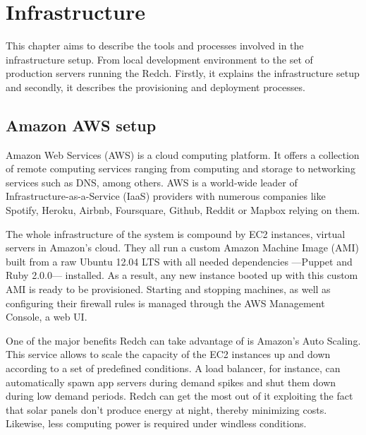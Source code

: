 \chapter{Infrastructure}

This chapter aims to describe the tools and processes involved in the infrastructure setup. From local development environment to the set of production servers running the Redch. Firstly, it explains the infrastructure setup and secondly, it describes the provisioning and deployment processes.

\section{Amazon AWS setup}

Amazon Web Services (AWS) is a cloud computing platform. It offers a collection of remote computing services ranging from computing and storage to networking services such as DNS, among others. AWS is a world-wide leader of Infrastructure-as-a-Service (IaaS) providers with numerous companies like Spotify, Heroku, Airbnb, Foursquare, Github, Reddit or Mapbox relying on them.

The whole infrastructure of the system is compound by EC2 instances, virtual servers in Amazon's cloud. They all run a custom Amazon Machine Image (AMI) built from a raw Ubuntu 12.04 LTS with all needed dependencies ---Puppet and Ruby 2.0.0--- installed. As a result, any new instance booted up with this custom AMI is ready to be provisioned. Starting and stopping machines, as well as configuring their firewall rules is managed through the AWS Management Console, a web UI.

One of the major benefits Redch can take advantage of is Amazon's Auto Scaling. This service allows to scale the capacity of the EC2 instances up and down according to a set of predefined conditions. A load balancer, for instance, can automatically spawn app servers during demand spikes and shut them down during low demand periods. Redch can get the most out of it exploiting the fact that solar panels don't produce energy at night, thereby minimizing costs. Likewise, less computing power is required under windless conditions.

